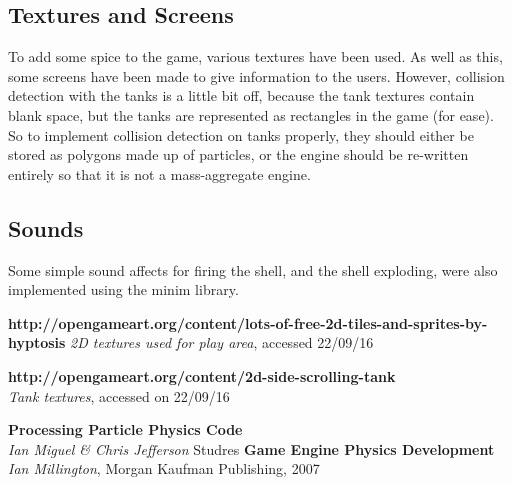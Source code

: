 \documentclass[12pt]{article}
\begin{document}
\subsection{Textures and Screens}
To add some spice to the game, various textures have been used. As well as this, some screens have been made to give information to the users. However, collision detection with the tanks is a little bit off, because the tank textures contain blank space, but the tanks are represented as rectangles in the game (for ease). So to implement collision detection on tanks properly, they should either be stored as polygons made up of particles, or the engine should be re-written entirely so that it is not a mass-aggregate engine.
\subsection{Sounds}
Some simple sound affects for firing the shell, and the shell exploding, were also implemented using the minim library.


\begin{thebibliography}{9}
  \textbf{http://opengameart.org/content/lots-of-free-2d-tiles-and-sprites-by-hyptosis}
  \emph{2D textures used for play area},
  accessed 22/09/16

  \textbf{http://opengameart.org/content/2d-side-scrolling-tank}
  \\
  \emph{Tank textures},
  accessed on 22/09/16
  
   \textbf{Processing Particle Physics Code}\\
   \emph{Ian Miguel \& Chris Jefferson}
   Studres
   \textbf{Game Engine Physics Development}\\
   \emph{Ian Millington},
   Morgan Kaufman Publishing, 2007
\end{thebibliography}
\end{document}
